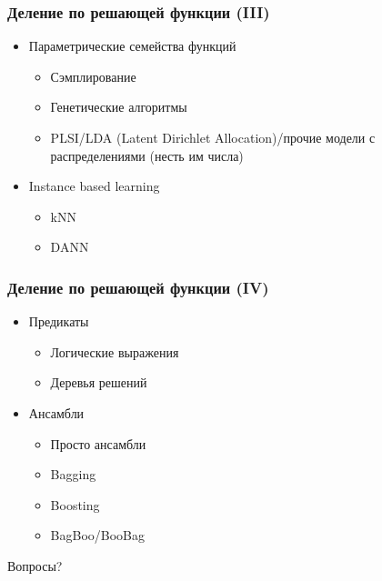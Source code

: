 \documentclass[14pt, fleqn, xcolor={dvipsnames, table}]{beamer}
\begin{document}
\begin{frame}
\frametitle{Деление по решающей функции (III)}
\begin{itemize}
\item Параметрические семейства функций
	\begin{itemize}
		\item Сэмплирование
		\item Генетические алгоритмы
		\item PLSI/LDA (Latent Dirichlet Allocation)/прочие модели с распределениями (несть им числа)
	\end{itemize}
\item Instance based learning
	\begin{itemize}
		\item kNN
		\item DANN
	\end{itemize}
\end{itemize}
\end{frame}

\begin{frame}
\frametitle{Деление по решающей функции (IV)}
\begin{itemize}
\item Предикаты
	\begin{itemize}
	\item Логические выражения
	\item Деревья решений
	\end{itemize}
\item Ансамбли
	\begin{itemize}
	\item Просто ансамбли 
	\item Bagging
	\item Boosting
	\item BagBoo/BooBag
	\end{itemize}
\end{itemize}
\end{frame}

\begin{frame}
\begin{center}\huge
Вопросы?
\end{center}
\end{frame}

\renewcommand{\arraystretch}{1.5}
\end{document}
